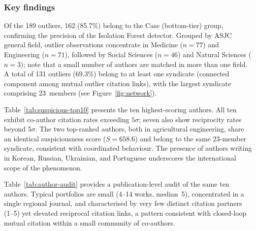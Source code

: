 \subsubsection*{Key findings}

Of the 189 outliers, 162 (85.7\%) belong to the Case (bottom-tier)
group, confirming the precision of the Isolation Forest detector.
Grouped by ASJC general field, outlier observations concentrate in
Medicine ($n=77$) and Engineering ($n=71$), followed by Social
Sciences ($n=46$) and Natural Sciences ($n=3$); note that a small
number of authors are matched in more than one field.
A total of 131 outliers (69.3\%) belong to at least one syndicate
(connected component among mutual outlier citation links), with the
largest syndicate comprising 23~members (see Figure~\ref{fig:network}).

Table~\ref{tab:suspicious-top10} presents the ten highest-scoring
authors.
All ten exhibit co-author citation rates exceeding $5\sigma$;
seven also show reciprocity rates beyond $5\sigma$.
The two top-ranked authors, both in agricultural engineering,
share an identical suspiciousness score ($S = 658.6$) and belong to
the same 23-member syndicate, consistent with coordinated behaviour.
The presence of authors writing in Korean, Russian, Ukrainian, and
Portuguese underscores the international scope of the phenomenon.

Table~\ref{tab:author-audit} provides a publication-level audit of
the same ten authors.
Typical portfolios are small (4--14 works, median~5), concentrated
in a single regional journal, and characterised by very few distinct
citation partners (1--5) yet elevated reciprocal citation links,
a pattern consistent with closed-loop mutual citation within a
small community of co-authors.

